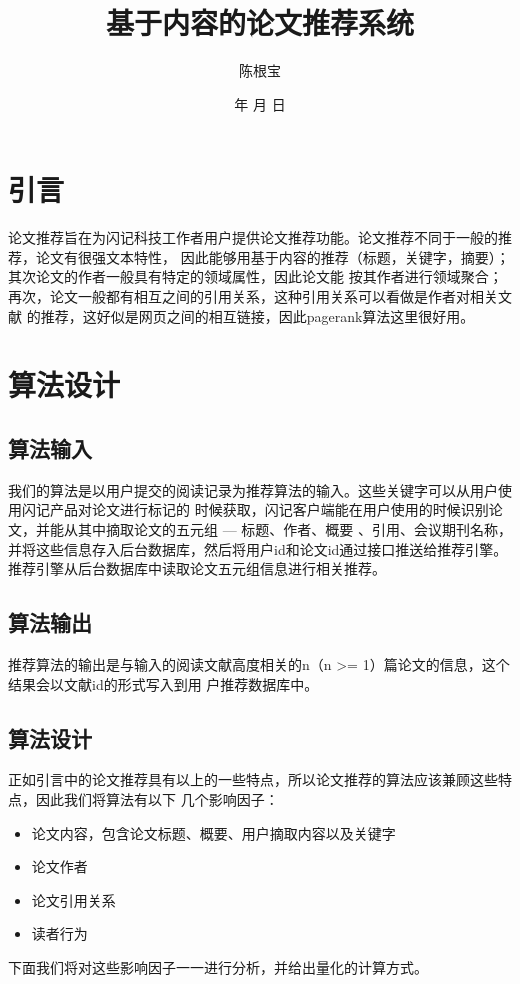 \documentclass[a4paper]{article}
\begin{document}
\renewcommand{\today}{\number\year 年 \number\month 月 \number\day 日}
\renewcommand{\contentsname}{目 \quad 录}
\title{基于内容的论文推荐系统}
\author{陈根宝}
\date{\today}
\maketitle
\newpage
\tableofcontents
\newpage
\section{引言}
论文推荐旨在为闪记科技工作者用户提供论文推荐功能。论文推荐不同于一般的推荐，论文有很强文本特性，%
因此能够用基于内容的推荐（标题，关键字，摘要）；其次论文的作者一般具有特定的领域属性，因此论文能%
按其作者进行领域聚合；再次，论文一般都有相互之间的引用关系，这种引用关系可以看做是作者对相关文献%
的推荐，这好似是网页之间的相互链接，因此pagerank算法这里很好用。
\section{算法设计}
\subsection{算法输入}
我们的算法是以用户提交的阅读记录为推荐算法的输入。这些关键字可以从用户使用闪记产品对论文进行标记的%
时候获取，闪记客户端能在用户使用的时候识别论文，并能从其中摘取论文的五元组 --- 标题、作者、概要%
、引用、会议期刊名称，并将这些信息存入后台数据库，然后将用户id和论文id通过接口推送给推荐引擎。%
推荐引擎从后台数据库中读取论文五元组信息进行相关推荐。
\subsection{算法输出}
推荐算法的输出是与输入的阅读文献高度相关的n（n >= 1）篇论文的信息，这个结果会以文献id的形式写入到用%
户推荐数据库中。
\subsection{算法设计}
正如引言中的论文推荐具有以上的一些特点，所以论文推荐的算法应该兼顾这些特点，因此我们将算法有以下%
几个影响因子：
\begin{itemize}
\item 论文内容，包含论文标题、概要、用户摘取内容以及关键字
\item 论文作者
\item 论文引用关系
\item 读者行为
\end{itemize}
下面我们将对这些影响因子一一进行分析，并给出量化的计算方式。
\end{document}
